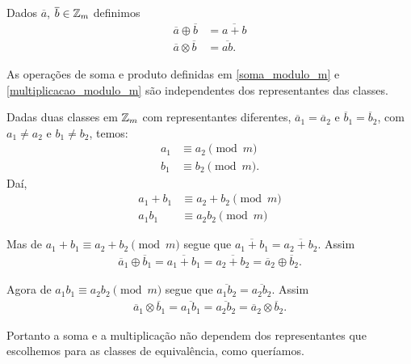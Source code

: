 \begin{definicao}
    Dados $\overline{a}$, $\overline{b} \in \mathbb{Z}_m$ definimos
    \begin{align}
        \overline{a}\oplus\overline{b} &= \overline{a + b}\label{soma_modulo_m}\\
        \overline{a}\otimes\overline{b} &= \overline{ab}.\label{multiplicacao_modulo_m}
    \end{align}
\end{definicao}

\begin{proposicao}
    As operações de soma e produto definidas em \eqref{soma_modulo_m} e \eqref{multiplicacao_modulo_m} são independentes dos representantes das classes.
\end{proposicao}
\begin{prova}
    Dadas duas classes em $\mathbb{Z}_m$ com representantes diferentes, $\overline{a}_{1} = \overline{a}_{2}$ e  $\overline{b}_{1} = \overline{b}_{2}$, com $a_{1}\ne a_{2}$ e $b_{1}\ne b_{2}$,  temos:
            \begin{align*}
                a_1 &\equiv a_2 \pmod m\\
                b_1 &\equiv b_2 \pmod m.
            \end{align*}
            Daí,
            \begin{align*}
                a_1 + b_1 &\equiv a_2 + b_2 \pmod m\\
                a_1b_1 &\equiv a_2b_2 \pmod m
            \end{align*}

        Mas de $a_1 + b_1 \equiv a_2 + b_2 \pmod m$ segue que $\overline{a_1 + b_1} = \overline{a_2 + b_2}$. Assim
        \begin{align*}
            \overline{a}_{1}\oplus \overline{b}_{1} = \overline{a_{1}+b_{1}} = \overline{a_{2} + b_{2}} = \overline{a}_{2}\oplus \overline{b}_{2}.
        \end{align*}

        Agora de $a_1b_1 \equiv a_2b_2 \pmod m$  segue que $\overline{a_1b_2} =  \overline{a_2b_2}$. Assim
        \begin{align*}
            \overline{a}_{1}\otimes \overline{b}_{1} = \overline{a_{1}b_{1}} = \overline{a_{2}b_{2}} = \overline{a}_{2}\otimes\overline{b}_{2}.
        \end{align*}

        Portanto a soma e a multiplicação não dependem dos representantes que escolhemos para as classes de equivalência, como queríamos.\hspace{.3cm}
\end{prova}

